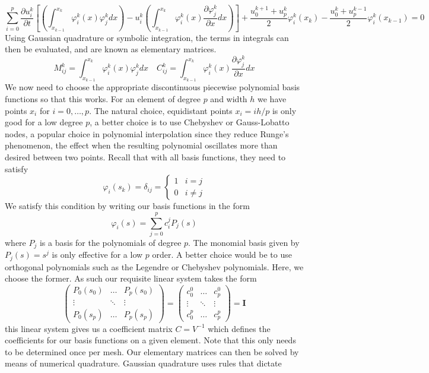 \documentclass[openany]{book}
\newcommand{\p}[2]{\frac{\partial#1}{\partial#2}}
\begin{document}
\begin{dmath*}
\sum^p_{i=0}\p{u_i^k}{t}\left[\left(\int_{x_{k-1}}^{x_k} \varphi^k_i(x)\varphi^k_j dx\right) - u_i^k\left(\int_{x_{k-1}}^{x_k} \varphi^k_i(x)  \p{\varphi_j^k}{x}dx \right)\right] + \frac{u_0^{k+1} + u_p^k}{2}\varphi^k_i(x_k) - \frac{u_0^k + u_p^{k-1}}{2}\varphi_i^k(x_{k-1})= 0
\end{dmath*}
Using Gaussian quadrature or symbolic integration, the terms in integrals can then be evaluated, and are known as elementary matrices. 
$$ M^k_{ij} = \int_{x_{k-1}}^{x_k} \varphi^k_i(x)\varphi^k_j dx \quad C^k_{ij} = \int_{x_{k-1}}^{x_k} \varphi^k_i(x)  \p{\varphi_j^k}{x}dx$$
We now need to choose the appropriate discontinuous piecewise polynomial basis functions so that this works. For an element of degree $p$ and width $h$ we have points $x_i$ for $i=0,\dots,p$. The natural choice, equidistant points $x_i = ih/p$ is only good for a low degree $p$, a better choice is to use Chebyshev or Gauss-Lobatto nodes, a popular choice in polynomial interpolation since they reduce Runge's phenomenon, the effect when the resulting polynomial oscillates more than desired between two points. Recall that with all basis functions, they need to satisfy
$$\varphi_i(s_k) = \delta_{ij} = \begin{cases} 1 & i = j \\ 0 & i \neq j \end{cases} $$
We satisfy this condition by writing our basis functions in the form
$$\varphi_i(s) = \sum^p_{j=0} c_i^j P_j(s) $$
where $P_j$ is a basis for the polynomials of degree $p$. The monomial basis given by $P_j(s) = s^j$ is only effective for a low $p$ order. A better choice would be to use orthogonal polynomials such as the Legendre or Chebyshev polynomials. Here, we choose the former. As such our requisite linear system takes the form
$$\begin{pmatrix} P_0(s_0) & \dots & P_p(s_0) \\ \vdots & \ddots & \vdots \\ P_0(s_p) & \dots & P_p(s_p) \end{pmatrix} = \begin{pmatrix} c_0^0 & \dots & c_p^0 \\ \vdots & \ddots & \vdots \\ c_0^p & \dots & c_p^p  \end{pmatrix} = \mathbf{I}$$
this linear system gives us a coefficient matrix $C = V^{-1}$ which defines the coefficients for our basis functions on a given element. Note that this only needs to be determined once per mesh. Our elementary matrices can then be solved by means of numerical quadrature. Gaussian quadrature uses rules that dictate
\end{document}
